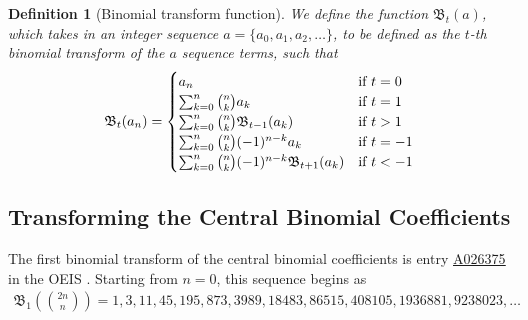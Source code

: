\documentclass[12pt,reqno]{article}
\theoremstyle{plain}
\newtheorem{definition}[theorem]{Definition}
\newcommand{\BT}{\mathfrak{B}}
\newcommand{\seqnum}[1]{\href{https://oeis.org/#1}{\rm \underline{#1}}}
\begin{document}
\begin{definition}[Binomial transform function] \label{definition:binomialtransforms}
We define the function $\BT_t(a)$, which takes in an integer sequence $a = \{ a_0, a_1, a_2, \ldots \}$, to be defined as the $t$-th binomial transform of the $a$ sequence terms, such that
\begin{displaymath}
    \BT_{t}(a_n) =
    \begin{cases}
        a_n &\textup{if } t = 0 \\
        \sum_{k=0}^{n} \binom{n}{k} a_k &\textup{if } t = 1 \\
        \sum_{k=0}^{n} \binom{n}{k} \BT_{t-1}(a_k) &\textup{if } t > 1 \\
        \sum_{k=0}^{n} \binom{n}{k} (-1)^{n-k} a_k  &\textup{if } t = -1 \\
        \sum_{k=0}^{n} \binom{n}{k} (-1)^{n-k} \BT_{t+1}(a_k) &\textup{if } t < -1
    \end{cases}
\end{displaymath}
\end{definition}

\subsection{Transforming the Central Binomial Coefficients}
The first binomial transform of the central binomial coefficients is entry \seqnum{A026375} in the OEIS \cite{A026375}. Starting from $n=0$, this sequence begins as
\begin{align*}
    \BT_{1}\left(\binom{2n}{n}\right) = 1, 3, 11, 45, 195, 873, 3989, 18483, 86515, 408105, 1936881, 9238023, \ldots
\end{align*}
\end{document}
